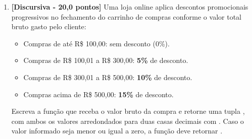 \begin{enumerate}[label=\textbf{Q\arabic*.}, start=1]
\begin{verbatim}
class SensorSonar(Sensor):
    def __init__(self, identificador: str, profundidade_max: float):
        super().__init__(identificador)
        self.profundidade = profundidade_max
    
    def obter_status(self) -> str:
        msg_base = super().obter_status()
        return f"{msg_base} (Prof: {self.profundidade}m)"
\end{verbatim}
Ao instanciar \texttt{s = SensorSonar("SN-01", 300.0)} e executar \texttt{s.obter\_status()}, qual será o retorno produzido?

\begin{enumerate}[label=\textbf{(\Alph*)}]
    \item \texttt{"Sensor SN-01: ATIVO"}
    \item \texttt{"(Prof: 300.0m)"}
    \item Ocorre um erro de execução (\texttt{AttributeError}), pois \texttt{super()} não pode acessar métodos com o mesmo nome.
    \item \texttt{"Sensor SN-01: ATIVO (Prof: 300.0m)"}
    \item \texttt{"Sensor: None (Prof: 300.0m)"}
\end{enumerate}



\ifmostrarGabarito\else\clearpage\fi

\section*{Parte II: Questões Discursivas e de Programação (Q8 a Q10 — 70,0 Pontos)}

\item \textbf{[Discursiva - 20,0 pontos]} Uma loja online aplica descontos promocionais progressivos no fechamento do carrinho de compras conforme o valor total bruto gasto pelo cliente:
\begin{itemize}[leftmargin=*]
    \item Compras de até R\$ 100,00: sem desconto (0\%).
    \item Compras de R\$ 100,01 a R\$ 300,00: \textbf{5\%} de desconto.
    \item Compras de R\$ 300,01 a R\$ 500,00: \textbf{10\%} de desconto.
    \item Compras acima de R\$ 500,00: \textbf{15\%} de desconto.
\end{itemize}
Escreva a função  que receba o valor bruto da compra e retorne uma tupla , com ambos os valores arredondados para duas casas decimais com . Caso o valor informado seja menor ou igual a zero, a função deve retornar .


\end{enumerate}
